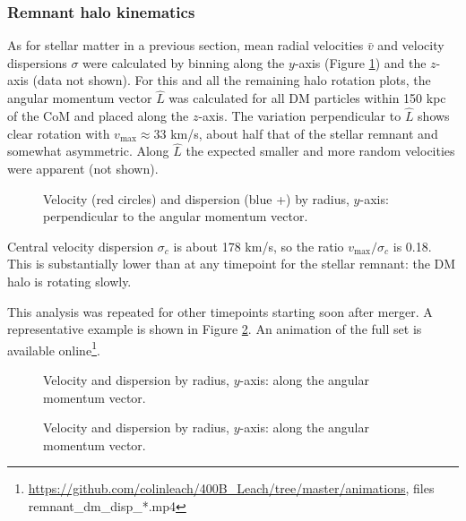 \documentclass[twocolumn]{aastex63}
\begin{document}
\subsubsection{Remnant halo kinematics}

As for stellar matter in a previous section, mean radial velocities $\bar{v}$ and velocity dispersions $\sigma$ were calculated by binning along the $y$-axis (Figure \ref{fig:rem_dm_disp_y_801}) and the $z$-axis (data not shown). For this and all the remaining halo rotation plots, the angular momentum vector $\hat{L}$ was calculated for all DM particles within 150 kpc of the CoM and placed along the $z$-axis. The variation perpendicular to $\hat{L}$ shows clear rotation with $v_{\text{max}} \approx 33$ km/s, about half that of the stellar remnant and somewhat asymmetric. Along $\hat{L}$ the expected smaller and more random velocities were apparent (not shown).

\begin{figure}[htb!]
	\caption{Velocity (red circles) and dispersion (blue +) by radius, $y$-axis: perpendicular to the angular momentum vector.
		\label{fig:rem_dm_disp_y_801}}
\end{figure}


Central velocity dispersion $\sigma_c$ is about 178 km/s, so the ratio $v_{\text{max}} / \sigma_c$ is 0.18. This is substantially lower than at any timepoint for the stellar remnant: the DM halo is rotating slowly.

This analysis was repeated for other timepoints starting soon after merger. A representative example is shown in Figure \ref{fig:rem_dm_disp_y_450}. An animation of the full set is available online\footnote{\url{https://github.com/colinleach/400B_Leach/tree/master/animations}, files remnant\_dm\_disp\_*.mp4 }.

\begin{figure}[htb!]
	\caption{Velocity and dispersion by radius, $y$-axis: along the angular momentum vector.
		\label{fig:rem_dm_disp_y_450}}
\end{figure}

\begin{figure}[htb!]
	\caption{Velocity and dispersion by radius, $y$-axis: along the angular momentum vector.
		\label{fig:rem_dm_disp_y_600}}
\end{figure}
\end{document}
